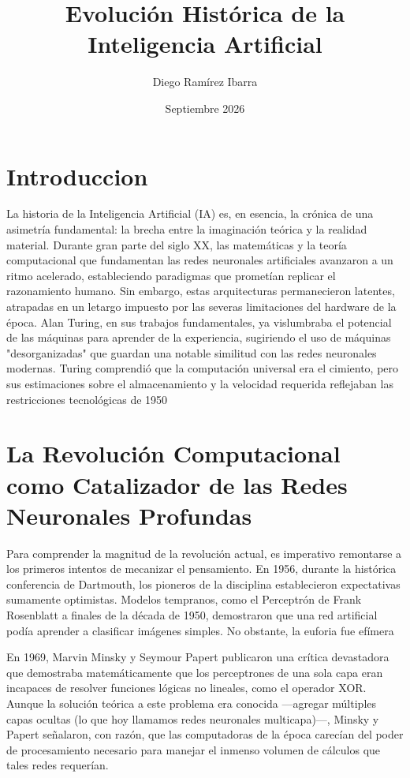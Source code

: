 \documentclass[12pt,a4paper]{article}
\title{Evolución Histórica de la Inteligencia Artificial}
\author{Diego Ramírez Ibarra}
\date{Septiembre 2026}
\begin{document}
\maketitle

\section{Introduccion}
La historia de la Inteligencia Artificial (IA) es, en esencia, la crónica de una asimetría fundamental: la brecha entre la imaginación teórica y la realidad material. Durante gran parte del siglo XX, las matemáticas y la teoría computacional que fundamentan las redes neuronales artificiales avanzaron a un ritmo acelerado, estableciendo paradigmas que prometían replicar el razonamiento humano. Sin embargo, estas arquitecturas permanecieron latentes, atrapadas en un letargo impuesto por las severas limitaciones del hardware de la época. Alan Turing, en sus trabajos fundamentales, ya vislumbraba el potencial de las máquinas para aprender de la experiencia, sugiriendo el uso de máquinas "desorganizadas" que guardan una notable similitud con las redes neuronales modernas. Turing comprendió que la computación universal era el cimiento, pero sus estimaciones sobre el almacenamiento y la velocidad requerida reflejaban las restricciones tecnológicas de 1950

\section{La Revolución Computacional como Catalizador de las Redes Neuronales Profundas}
Para comprender la magnitud de la revolución actual, es imperativo remontarse a los primeros intentos de mecanizar el pensamiento. En 1956, durante la histórica conferencia de Dartmouth, los pioneros de la disciplina establecieron expectativas sumamente optimistas. Modelos tempranos, como el Perceptrón de Frank Rosenblatt a finales de la década de 1950, demostraron que una red artificial podía aprender a clasificar imágenes simples. No obstante, la euforia fue efímera

En 1969, Marvin Minsky y Seymour Papert publicaron una crítica devastadora que demostraba matemáticamente que los perceptrones de una sola capa eran incapaces de resolver funciones lógicas no lineales, como el operador XOR. Aunque la solución teórica a este problema era conocida —agregar múltiples capas ocultas (lo que hoy llamamos redes neuronales multicapa)—, Minsky y Papert señalaron, con razón, que las computadoras de la época carecían del poder de procesamiento necesario para manejar el inmenso volumen de cálculos que tales redes requerían.
\end{document}
